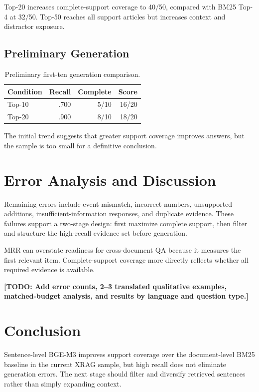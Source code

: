 \documentclass[11pt]{article}
\begin{document}
Top-20 increases complete-support coverage to 40/50, compared with BM25 Top-4 at 32/50. Top-50 reaches all support articles but increases context and distractor exposure.

\subsection{Preliminary Generation}
\begin{table}[t]
\centering
\small
\begin{tabular}{lrrr}
\toprule
Condition & Recall & Complete & Score \\
\midrule
Top-10 & .700 & 5/10 & 16/20 \\
Top-20 & .900 & 8/10 & 18/20 \\
\bottomrule
\end{tabular}
\caption{Preliminary first-ten generation comparison.}
\label{tab:generation}
\end{table}

The initial trend suggests that greater support coverage improves answers, but the sample is too small for a definitive conclusion.

\section{Error Analysis and Discussion}
Remaining errors include event mismatch, incorrect numbers, unsupported additions, insufficient-information responses, and duplicate evidence. These failures support a two-stage design: first maximize complete support, then filter and structure the high-recall evidence set before generation.

MRR can overstate readiness for cross-document QA because it measures the first relevant item. Complete-support coverage more directly reflects whether all required evidence is available.

\textbf{[TODO: Add error counts, 2--3 translated qualitative examples, matched-budget analysis, and results by language and question type.]}

\section{Conclusion}
Sentence-level BGE-M3 improves support coverage over the document-level BM25 baseline in the current XRAG sample, but high recall does not eliminate generation errors. The next stage should filter and diversify retrieved sentences rather than simply expanding context.
\end{document}
